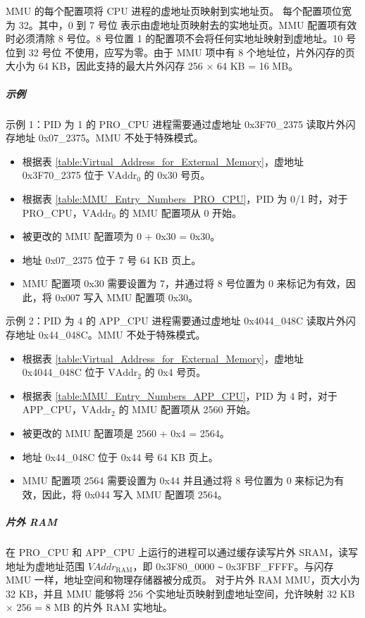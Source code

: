 MMU 的每个配置项将 CPU 进程的虚地址页映射到实地址页。 每个配置项位宽为 32。其中，0 到 7 号位 表示由虚地址页映射去的实地址页。MMU 配置项有效时必须清除 8 号位。8 号位置 1 的配置项不会将任何实地址映射到虚地址。10 号位到 32 号位 不使用，应写为零。由于 MMU 项中有 8 个地址位，片外闪存的页大小为 64 KB，因此支持的最大片外闪存 256 × 64 KB = 16 MB。

\subparagraph{示例}

示例 1：PID 为 1 的 PRO\_CPU 进程需要通过虚地址 0x3F70\_2375 读取片外闪存地址 0x07\_2375。MMU 不处于特殊模式。
\begin{itemize}
\itemsep-0.5em
\item 根据表 \ref{table:Virtual_Address_for_External_Memory}，虚地址 0x3F70\_2375 位于 $\mathrm{VAddr}_0$ 的 0x30 号页。
\item 根据表 \ref{table:MMU_Entry_Numbers_PRO_CPU}，PID 为 0/1 时，对于 PRO\_CPU，$\mathrm{VAddr}_0$ 的 MMU 配置项从 0 开始。
\item 被更改的 MMU 配置项为 0 + 0x30 = 0x30。

\item 地址 0x07\_2375 位于 7 号 64 KB 页上。

\item MMU 配置项 0x30 需要设置为 7，并通过将 8 号位置为 0 来标记为有效，因此，将 0x007 写入 MMU 配置项 0x30。
\end{itemize}


示例 2：PID 为 4 的 APP\_CPU 进程需要通过虚地址 0x4044\_048C 读取片外闪存地址 0x44\_048C。MMU 不处于特殊模式。

\begin{itemize}
\itemsep-0.5em
\item 根据表 \ref{table:Virtual_Address_for_External_Memory}，虚地址 0x4044\_048C 位于 $\mathrm{VAddr}_{2}$ 的 0x4 号页。
\item 根据表 \ref{table:MMU_Entry_Numbers_APP_CPU}，PID 为 4 时，对于 APP\_CPU，$\mathrm{VAddr}_{2}$ 的 MMU 配置项从 2560 开始。
\item 被更改的 MMU 配置项是 2560 + 0x4 = 2564。
\item 地址 0x44\_048C 位于 0x44 号 64 KB 页上。
\item MMU 配置项 2564 需要设置为 0x44 并且通过将 8 号位置为 0 来标记为有效，因此，将 0x044 写入 MMU 配置项 2564。
\end{itemize}

\subparagraph{片外 RAM}

在 PRO\_CPU 和 APP\_CPU 上运行的进程可以通过缓存读写片外 SRAM，读写地址为虚地址范围 $VAddr_{\mathrm{RAM}}$，即 0x3F80\_0000 \verb+~+ 0x3FBF\_FFFF。与闪存 MMU 一样，地址空间和物理存储器被分成页。 对于片外 RAM MMU，页大小为 32 KB，并且 MMU 能够将 256 个实地址页映射到虚地址空间，允许映射 32 KB × 256 = 8 MB 的片外 RAM 实地址。

